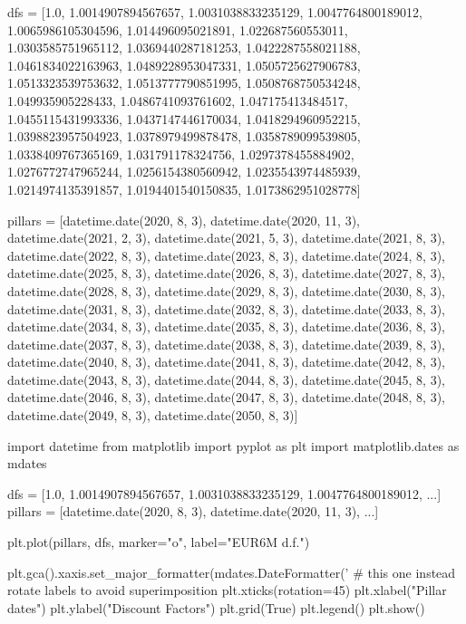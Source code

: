 \begin{ipython}
dfs = [1.0, 1.0014907894567657, 1.0031038833235129, 1.0047764800189012,
       1.0065986105304596, 1.014496095021891, 1.022687560553011,
       1.0303585751965112, 1.0369440287181253, 1.0422287558021188,
       1.0461834022163963, 1.0489228953047331, 1.0505725627906783, 
       1.0513323539753632, 1.0513777790851995, 1.0508768750534248,
       1.049935905228433, 1.0486741093761602, 1.047175413484517,
       1.0455115431993336, 1.0437147446170034, 1.0418294960952215,
       1.0398823957504923, 1.0378979499878478, 1.0358789099539805,
       1.0338409767365169, 1.031791178324756, 1.0297378455884902,
       1.0276772747965244, 1.0256154380560942, 1.0235543974485939,
       1.0214974135391857, 1.0194401540150835, 1.0173862951028778]

pillars = [datetime.date(2020, 8, 3), datetime.date(2020, 11, 3),
		   datetime.date(2021, 2, 3), datetime.date(2021, 5, 3),
		   datetime.date(2021, 8, 3), datetime.date(2022, 8, 3),
		   datetime.date(2023, 8, 3), datetime.date(2024, 8, 3),
		   datetime.date(2025, 8, 3), datetime.date(2026, 8, 3),
		   datetime.date(2027, 8, 3), datetime.date(2028, 8, 3),
		   datetime.date(2029, 8, 3), datetime.date(2030, 8, 3),
		   datetime.date(2031, 8, 3), datetime.date(2032, 8, 3),
		   datetime.date(2033, 8, 3), datetime.date(2034, 8, 3),
		   datetime.date(2035, 8, 3), datetime.date(2036, 8, 3),
		   datetime.date(2037, 8, 3), datetime.date(2038, 8, 3),
		   datetime.date(2039, 8, 3), datetime.date(2040, 8, 3),
		   datetime.date(2041, 8, 3), datetime.date(2042, 8, 3),
		   datetime.date(2043, 8, 3), datetime.date(2044, 8, 3),
		   datetime.date(2045, 8, 3), datetime.date(2046, 8, 3),
		   datetime.date(2047, 8, 3), datetime.date(2048, 8, 3),
           datetime.date(2049, 8, 3), datetime.date(2050, 8, 3)]
\end{ipython}

\begin{solution}
\end{solution}

\begin{ipython}
import datetime
from matplotlib import pyplot as plt
import matplotlib.dates as mdates

dfs = [1.0, 1.0014907894567657, 1.0031038833235129, 1.0047764800189012, ...]
pillars = [datetime.date(2020, 8, 3), datetime.date(2020, 11, 3), ...]

plt.plot(pillars, dfs, marker="o", label="EUR6M d.f.")

plt.gca().xaxis.set_major_formatter(mdates.DateFormatter('%
# this one instead rotate labels to avoid superimposition
plt.xticks(rotation=45)
plt.xlabel("Pillar dates")
plt.ylabel("Discount Factors")
plt.grid(True)
plt.legend()
plt.show()
\end{ipython}

